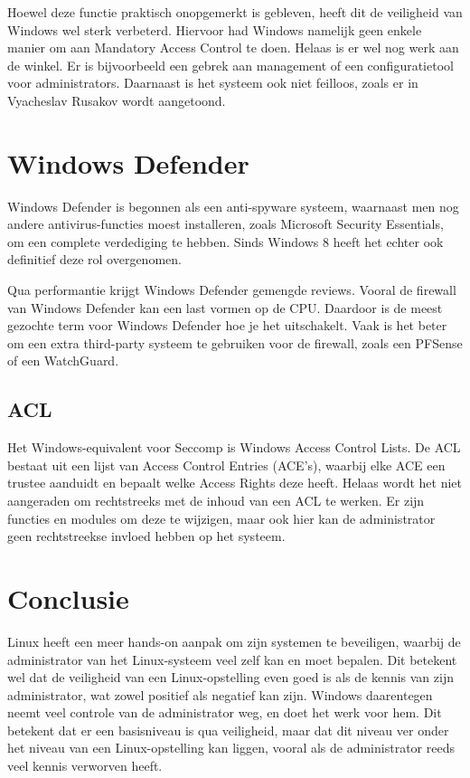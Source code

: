 Hoewel deze functie praktisch onopgemerkt is gebleven, heeft dit de veiligheid van Windows wel sterk verbeterd. Hiervoor had Windows namelijk geen enkele manier om aan Mandatory Access Control te doen. Helaas is er wel nog werk aan de winkel. Er is bijvoorbeeld een gebrek aan management of een configuratietool voor administrators. Daarnaast is het systeem ook niet feilloos, zoals er in Vyacheslav Rusakov wordt aangetoond. \autocite{Khanse2009} \autocite{Bradley2007} \autocite{Rusakov2016}

\section{Windows Defender}
Windows Defender is begonnen als een anti-spyware systeem, waarnaast men nog andere antivirus-functies moest installeren, zoals Microsoft Security Essentials, om een complete verdediging te hebben. Sinds Windows 8 heeft het echter ook definitief deze rol overgenomen.

Qua performantie krijgt Windows Defender gemengde reviews. Vooral de firewall van Windows Defender kan een last vormen op de CPU. Daardoor is de meest gezochte term voor Windows Defender hoe je het uitschakelt. Vaak is het beter om een extra third-party systeem te gebruiken voor de firewall, zoals een PFSense of een WatchGuard. \autocite{Hall2017} \autocite{Lefferts2017}

\subsection{ACL}
Het Windows-equivalent voor Seccomp is Windows Access Control Lists. De ACL bestaat uit een lijst van Access Control Entries (ACE's), waarbij elke ACE een trustee aanduidt en bepaalt welke Access Rights deze heeft. Helaas wordt het niet aangeraden om rechtstreeks met de inhoud van een ACL te werken. Er zijn functies en modules om deze te wijzigen, maar ook hier kan de administrator geen rechtstreekse invloed hebben op het systeem. \autocite{Rapid72017}

\section{Conclusie}
Linux heeft een meer hands-on aanpak om zijn systemen te beveiligen, waarbij de administrator van het Linux-systeem veel zelf kan en moet bepalen. Dit betekent wel dat de veiligheid van een Linux-opstelling even goed is als de kennis van zijn administrator, wat zowel positief als negatief kan zijn. Windows daarentegen neemt veel controle van de administrator weg, en doet het werk voor hem. Dit betekent dat er een basisniveau is qua veiligheid, maar dat dit niveau ver onder het niveau van een Linux-opstelling kan liggen, vooral als de administrator reeds veel kennis verworven heeft.